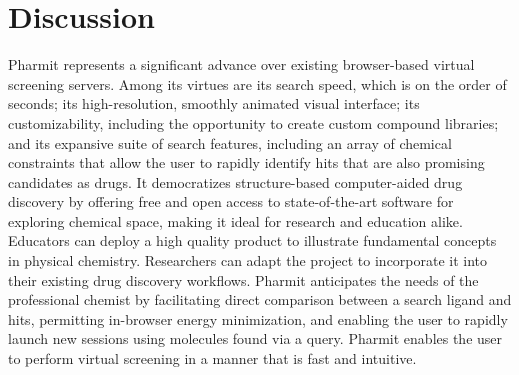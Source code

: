 \section{Discussion}
Pharmit represents a significant advance over existing browser-based virtual screening servers. Among its virtues are its search speed, which is on the order of seconds; its high-resolution, smoothly animated visual interface; its customizability, including the opportunity to create custom compound libraries; and its expansive suite of search features, including an array of chemical constraints that allow the user to rapidly identify hits that are also promising candidates as drugs. It democratizes structure-based computer-aided drug discovery by offering free and open access to state-of-the-art software for exploring chemical space, making it ideal for research and education alike. Educators can deploy a high quality product to illustrate fundamental concepts in physical chemistry. Researchers can adapt the project to incorporate it into their existing drug discovery workflows. Pharmit anticipates the needs of the professional chemist by facilitating direct comparison between a search ligand and hits, permitting in-browser energy minimization, and enabling the user to rapidly launch new sessions using molecules found via a query. Pharmit enables the user to perform virtual screening in a manner that is fast and intuitive. 


